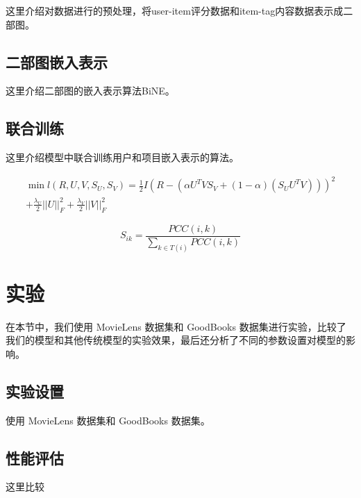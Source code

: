 \documentclass[lang=cn,11pt]{elegantpaper}
\begin{document}
这里介绍对数据进行的预处理，将user-item评分数据和item-tag内容数据表示成二部图。

\subsection{二部图嵌入表示}

这里介绍二部图的嵌入表示算法BiNE。


\subsection{联合训练}

这里介绍模型中联合训练用户和项目嵌入表示的算法。

\begin{equation}
\begin{array}{c}
\min l(R,U,V,{S_U},{S_V}) = \frac{1}{2}I{(R - (\alpha  {U^T}V{S_V} +  (1 - \alpha )({S_U} {U^T}V) ))^2}\\
+ \frac{{{\lambda _U}}}{2}||U||_F^2 + \frac{{{\lambda _V}}}{2}||V||_F^2
\end{array}
\end{equation}

\begin{equation}
S_{ik} = \frac{PCC(i,k)}{\sum_{k \in T(i)} PCC(i,k)}
\end{equation}



\section{实验}

在本节中，我们使用 MovieLens 数据集和 GoodBooks 数据集进行实验，比较了我们的模型和其他传统模型的实验效果，最后还分析了不同的参数设置对模型的影响。


\subsection{实验设置}

使用 MovieLens 数据集和 GoodBooks 数据集。

\subsection{性能评估}

这里比较
\end{document}
